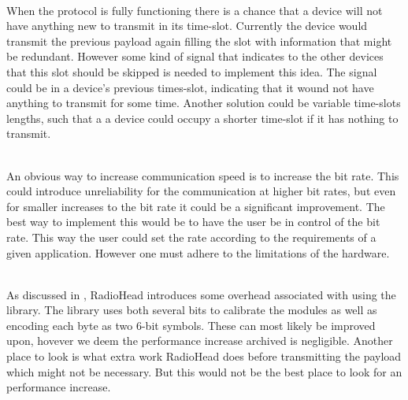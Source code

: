 \begin{description}[labelindent=\parindent]
    \item [Skip unnecessary transmissions]\hfill\\
When the protocol is fully functioning there is a chance that a device will not have anything new to transmit in its time-slot.
Currently the device would transmit the previous payload again filling the slot with information that might be redundant.
However some kind of signal that indicates to the other devices that this slot should be skipped is needed to implement this idea.
The signal could be in a device's previous times-slot, indicating that it wound not have anything to transmit for some time. 
Another solution could be variable time-slots lengths, such that a a device could occupy a shorter time-slot if it has nothing to transmit. 

    \item[Increase the bit rate]\hfill\\ 
An obvious way to increase communication speed is to increase the bit rate.
This could introduce unreliability for the communication at higher bit rates, but even for smaller increases to the bit rate it could be a significant improvement.
The best way to implement this would be to have the user be in control of the bit rate.
This way the user could set the rate according to the requirements of a given application.
However one must adhere to the limitations of the hardware.

    \item[Reduce overhead]\hfill\\
As discussed in , RadioHead introduces some overhead associated with using the library.
The library uses both several bits to calibrate the modules as well as encoding each byte as two 6-bit symbols.
These can most likely be improved upon, hovever we deem the performance increase archived is negligible.
Another place to look is what extra work RadioHead does before transmitting the payload which might not be necessary.
But this would not be the best place to look for an performance increase.


\end{description}
